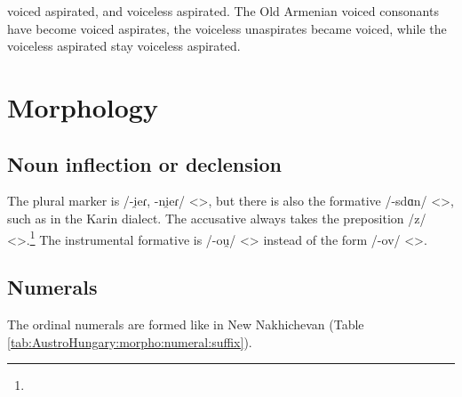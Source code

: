 \begin{adjarianpage}\label{page:271}\end{adjarianpage}%

voiced aspirated, and voiceless aspirated. The Old Armenian voiced consonants have become voiced aspirates, the voiceless unaspirates became voiced, while the voiceless aspirated stay voiceless aspirated. 

\section{Morphology}
\subsection{Noun inflection or declension}

The plural marker is /-i̯eɾ, -ni̯eɾ/ <>, but there is also the formative /-sdɑn/ <>, such as in the Karin dialect. The accusative always takes the preposition /z/ <>.\footnote{} The instrumental formative is /-ou̯/ <> instead of the form /-ov/ <>. 


\subsection{Numerals}

The ordinal numerals are formed like in New Nakhichevan (Table \ref{tab:AustroHungary:morpho:numeral:suffix}). 

\begin{table}[H]
	\centering 
	\caption{Ordinal numerals in the Austro-Hungary dialect}
	\label{tab:AustroHungary:morpho:numeral:suffix}
\end{table}

